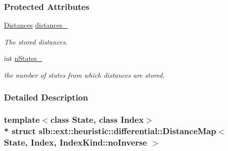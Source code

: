 \subsubsection*{Protected Attributes}
\begin{DoxyCompactItemize}
\item 
\hyperlink{structslb_1_1ext_1_1heuristic_1_1differential_1_1DistanceMap_3_01State_00_01Index_00_01IndexKind_1_1noInverse_01_4_acba898005faced74c6e3bf42c398f3d8}{Distances} \hyperlink{structslb_1_1ext_1_1heuristic_1_1differential_1_1DistanceMap_3_01State_00_01Index_00_01IndexKind_1_1noInverse_01_4_a3ec407ff0436904399c1e4924694895e}{distances\+\_\+}\hypertarget{structslb_1_1ext_1_1heuristic_1_1differential_1_1DistanceMap_3_01State_00_01Index_00_01IndexKind_1_1noInverse_01_4_a3ec407ff0436904399c1e4924694895e}{}\label{structslb_1_1ext_1_1heuristic_1_1differential_1_1DistanceMap_3_01State_00_01Index_00_01IndexKind_1_1noInverse_01_4_a3ec407ff0436904399c1e4924694895e}

\begin{DoxyCompactList}\small\item\em The stored distances. \end{DoxyCompactList}\item 
int \hyperlink{structslb_1_1ext_1_1heuristic_1_1differential_1_1DistanceMap_3_01State_00_01Index_00_01IndexKind_1_1noInverse_01_4_a218e5e9f9b895c79139cd04f6f4603c7}{n\+States\+\_\+}\hypertarget{structslb_1_1ext_1_1heuristic_1_1differential_1_1DistanceMap_3_01State_00_01Index_00_01IndexKind_1_1noInverse_01_4_a218e5e9f9b895c79139cd04f6f4603c7}{}\label{structslb_1_1ext_1_1heuristic_1_1differential_1_1DistanceMap_3_01State_00_01Index_00_01IndexKind_1_1noInverse_01_4_a218e5e9f9b895c79139cd04f6f4603c7}

\begin{DoxyCompactList}\small\item\em the number of states from which distances are stored. \end{DoxyCompactList}\end{DoxyCompactItemize}


\subsubsection{Detailed Description}
\subsubsection*{template$<$class State, class Index$>$\\*
struct slb\+::ext\+::heuristic\+::differential\+::\+Distance\+Map$<$ State, Index, Index\+Kind\+::no\+Inverse $>$}

